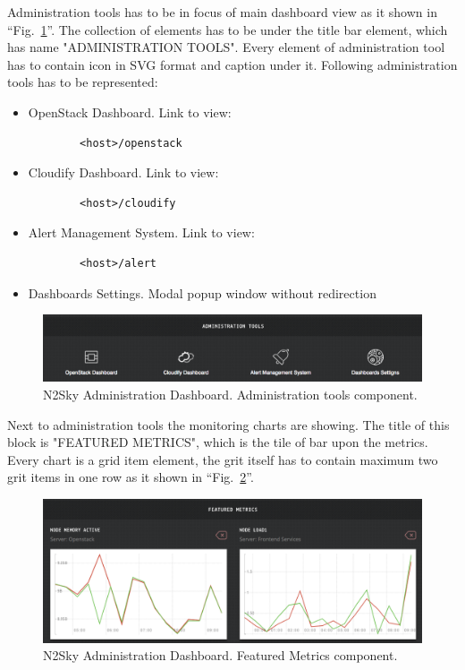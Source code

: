 Administration tools has to be in focus of main dashboard view as it shown in ``Fig.~\ref{fig:admin_tools}''. The collection of elements has to be under the title bar element, which has name "ADMINISTRATION TOOLS". Every element of administration tool has to contain icon in SVG \cite{Cagle2005} format and caption under it. Following administration tools has to be represented: 
\begin{itemize}
\item OpenStack Dashboard. Link to view: 
\begin{lstlisting}
		<host>/openstack
\end{lstlisting}
\item Cloudify Dashboard. Link to view: 
\begin{lstlisting}
		<host>/cloudify
\end{lstlisting}
\item Alert Management System. Link to view: 
\begin{lstlisting}
		<host>/alert
\end{lstlisting}
\item Dashboards Settings. Modal popup window without redirection
\end{itemize}

\begin{figure}[htbp]
\begin{center}
  \includegraphics[width=\linewidth]{components/4/pics/admin_tools.png}
  \caption{N2Sky Administration Dashboard. Administration tools component.}
  \label{fig:admin_tools}
\end{center}
\end{figure}

Next to administration tools the monitoring charts are showing. The title of this block is "FEATURED METRICS", which is the tile of bar upon the metrics.
Every chart is a grid item element, the grit itself has to contain maximum two grit items in one row as it shown in ``Fig.~\ref{fig:featured_metrics}''. 
 
\begin{figure}[htbp]
\begin{center}
  \includegraphics[width=\linewidth]{components/4/pics/featured_metrics.png}
  \caption{N2Sky Administration Dashboard. Featured Metrics component.}
  \label{fig:featured_metrics}
\end{center}
\end{figure}
 

